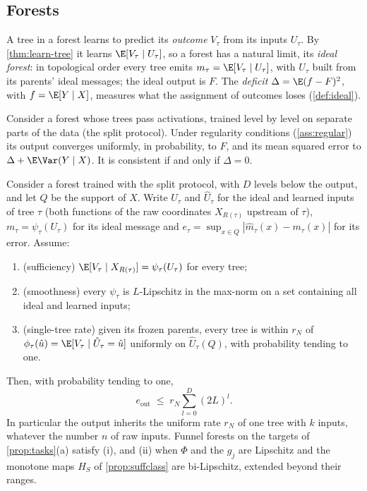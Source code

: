 \subsection{Forests}

A tree in a forest learns to predict its \emph{outcome} $V_\tau$ from its inputs $U_\tau$.
By \cref{thm:learn-tree} it learns $\E[V_\tau\mid U_\tau]$, so a forest has a natural limit,
its \emph{ideal forest}: in topological order every tree emits $m_\tau=\E[V_\tau\mid U_\tau]$,
with $U_\tau$ built from its parents' ideal messages; the ideal output is $F$.  The
\emph{deficit} $\Delta=\E(f-F)^2$, with $f=\E[Y\mid X]$, measures what the assignment of
outcomes loses (\cref{def:ideal}).

\begin{theorem}\label{thm:learn-forest}
Consider a forest whose trees pass activations, trained level by level on separate parts
of the data (the split protocol).  Under regularity conditions (\cref{ass:regular}) its
output converges uniformly, in probability, to $F$, and its mean squared error to
$\Delta+\E\Var(Y\mid X)$.  It is consistent if and only if $\Delta=0$.
\end{theorem}

\begin{theorem}\label{thm:learn-rate}
Consider a forest trained with the split protocol, with $D$ levels below the output, and
let $Q$ be the support of $X$.  Write $U_\tau$ and $\hat U_\tau$ for the ideal and learned
inputs of tree $\tau$ (both functions of the raw coordinates $X_{R(\tau)}$ upstream of
$\tau$), $m_\tau=\psi_\tau(U_\tau)$ for its ideal message and
$e_\tau=\sup_{x\in Q}|\hat m_\tau(x)-m_\tau(x)|$ for its error.  Assume:
\begin{enumerate}[label=(\roman*),leftmargin=*,noitemsep]
\item (sufficiency) $\E[V_\tau\mid X_{R(\tau)}]=\psi_\tau(U_\tau)$ for every tree;
\item (smoothness) every $\psi_\tau$ is $L$-Lipschitz in the max-norm on a set containing
  all ideal and learned inputs;
\item (single-tree rate) given its frozen parents, every tree is within $r_N$ of
  $\phi_\tau(\hat u)=\E[V_\tau\mid\hat U_\tau=\hat u]$ uniformly on $\hat U_\tau(Q)$, with
  probability tending to one.
\end{enumerate}
Then, with probability tending to one,
\[
  e_{\text{out}}\;\le\;r_N\sum_{l=0}^{D}(2L)^l .
\]
In particular the output inherits the uniform rate $r_N$ of one tree with $k$ inputs, whatever
the number $n$ of raw inputs.
Funnel forests on the targets of \cref{prop:tasks}(a) satisfy (i), and (ii) when $\Phi$ and
the $g_j$ are Lipschitz and the monotone maps $H_S$ of \cref{prop:suffclass} are bi-Lipschitz,
extended beyond their ranges.
\end{theorem}

